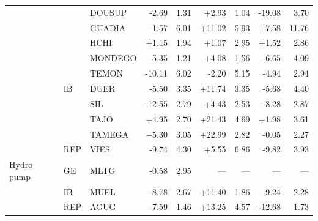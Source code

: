 \begin{tabular}{l l l r r r r r r}
 &  & DOUSUP & -2.69 & 1.31 & +2.93 & 1.04 & -19.08 & 3.70 \\
 &  & GUADIA & -1.57 & 6.01 & +11.02 & 5.93 & +7.58 & 11.76 \\
 &  & HCHI & +1.15 & 1.94 & +1.07 & 2.95 & +1.52 & 2.86 \\
 &  & MONDEGO & -5.35 & 1.21 & +4.08 & 1.56 & -6.65 & 4.09 \\
 &  & TEMON & -10.11 & 6.02 & -2.20 & 5.15 & -4.94 & 2.94 \\
 & IB & DUER & -5.50 & 3.35 & +11.74 & 3.35 & -5.68 & 4.40 \\
 &  & SIL & -12.55 & 2.79 & +4.43 & 2.53 & -8.28 & 2.87 \\
 &  & TAJO & +4.95 & 2.70 & +21.43 & 4.69 & +1.98 & 3.61 \\
 &  & TAMEGA & +5.30 & 3.05 & +22.99 & 2.82 & -0.05 & 2.27 \\
 & REP & VIES & -9.74 & 4.30 & +5.55 & 6.86 & -9.82 & 3.93 \\
\addlinespace
Hydro pump & GE & MLTG & -0.58 & 2.95 & --- & --- & --- & --- \\
 & IB & MUEL & -8.78 & 2.67 & +11.40 & 1.86 & -9.24 & 2.28 \\
 & REP & AGUG & -7.59 & 1.46 & +13.25 & 4.57 & -12.68 & 1.73 \\
\bottomrule
\end{tabular}